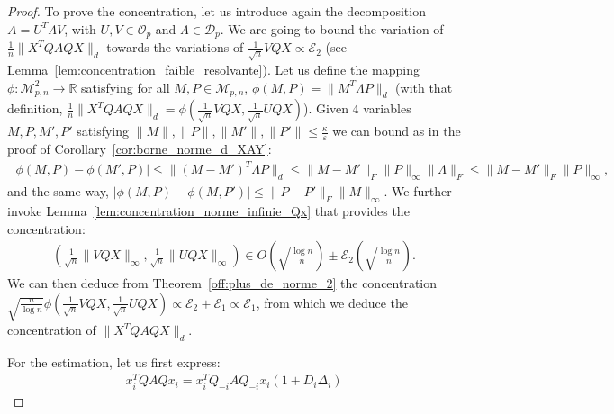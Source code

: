 \documentclass[a4papaer, titlepage]{book}
\begin{document}
\begin{proof}
To prove the concentration, let us introduce again the decomposition $A = U^T\Lambda V$, with $U,V \in \mathcal O_p$ and $\Lambda \in \mathcal D_p$. We are going to bound the variation of $\frac{1}{n}\|X^TQAQX\|_d$ towards the variations of $\frac{1}{\sqrt n}VQX \propto \mathcal E_2$ (see Lemma~\ref{lem:concentration_faible_resolvante}). 
Let us define the mapping $\phi : \mathcal M_{p,n}^2\to \mathbb R$ satisfying for all $M,P \in \mathcal M_{p,n}$, $\phi(M,P) = \|M^T\Lambda P\|_d$ (with that definition, $\frac{1}{n}\|X^TQAQX\|_d = \phi(\frac{1}{\sqrt n}VQX, \frac{1}{\sqrt n}UQX)$).
Given $4$ variables $M,P,M',P'$ satisfying $\|M\|,\|P\|,\|M'\|,\|P'\| \leq \frac{\kappa}{\varepsilon}$ we can bound as in the proof of Corollary~\ref{cor:borne_norme_d_XAY}:
\begin{align*}
  \left\vert \phi(M,P) - \phi(M',P)\right\vert \leq \|(M-M')^T\Lambda P\|_d \leq 
    \|M-M'\|_F \|P\|_\infty \|\Lambda\|_F
    \leq \|M-M'\|_F \|P\|_\infty,
\end{align*}
and the same way, $\left\vert \phi(M,P) - \phi(M,P')\right\vert \leq \|P-P'\|_F \|M\|_\infty$. 
We further invoke Lemma~\ref{lem:concentration_norme_infinie_Qx} that provides the concentration:
    \begin{align}\label{eq:bound_UQX_infty}
       \left( \frac{1}{\sqrt n}\|  VQ  X\|_\infty, \frac{1}{\sqrt n}
    \|  UQ  X\|_\infty \right)
    \in O \left(\sqrt{\frac{\log n}{n}}\right) \pm  \mathcal E_2 \left(\sqrt{\frac{\log n}{n}}\right).
     \end{align} 
     We can then deduce from Theorem~\ref{off:plus_de_norme_2} the concentration $\sqrt{\frac{ n}{\log n}} \phi(\frac{1}{\sqrt n}VQX, \frac{1}{\sqrt n}UQX) \propto \mathcal E_2 + \mathcal E_1 \propto \mathcal E_1$, from which we deduce the concentration of $\|X^TQAQX\|_d$.

For the estimation, let us first express:
\begin{align*}
  x_i^TQAQx_i
  = x_i^TQ_{-i}AQ_{-i}x_i(1 + D_i \Delta_i)
\end{align*}


\end{proof}
\end{document}

